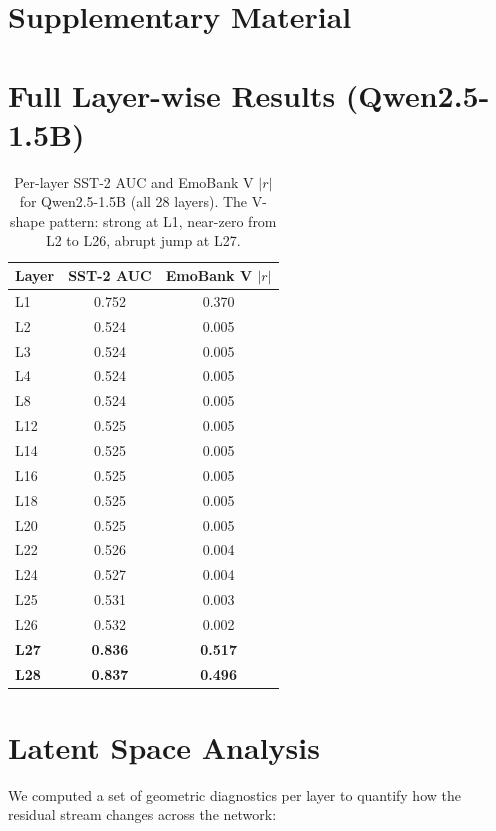 \section*{Supplementary Material}
\renewcommand{\thesection}{S\arabic{section}}
\setcounter{section}{0}

\section{Full Layer-wise Results (Qwen2.5-1.5B)}
\label{sup:layerwise}

\begin{table}[h]
\centering
\small
\caption{Per-layer SST-2 AUC and EmoBank V $|r|$ for Qwen2.5-1.5B (all 28
layers). The V-shape pattern: strong at L1, near-zero from L2 to L26, abrupt
jump at L27.}
\label{tab:sup_layerwise}
\begin{tabular}{lcc}
\toprule
Layer & SST-2 AUC & EmoBank V $|r|$ \\
\midrule
L1  & 0.752 & 0.370 \\
L2  & 0.524 & 0.005 \\
L3  & 0.524 & 0.005 \\
L4  & 0.524 & 0.005 \\
L8  & 0.524 & 0.005 \\
L12 & 0.525 & 0.005 \\
L14 & 0.525 & 0.005 \\
L16 & 0.525 & 0.005 \\
L18 & 0.525 & 0.005 \\
L20 & 0.525 & 0.005 \\
L22 & 0.526 & 0.004 \\
L24 & 0.527 & 0.004 \\
L25 & 0.531 & 0.003 \\
L26 & 0.532 & 0.002 \\
\textbf{L27} & \textbf{0.836} & \textbf{0.517} \\
\textbf{L28} & \textbf{0.837} & \textbf{0.496} \\
\bottomrule
\end{tabular}
\end{table}

\section{Latent Space Analysis}
\label{sup:latent}

We computed a set of geometric diagnostics per layer to quantify how the
residual stream changes across the network:

